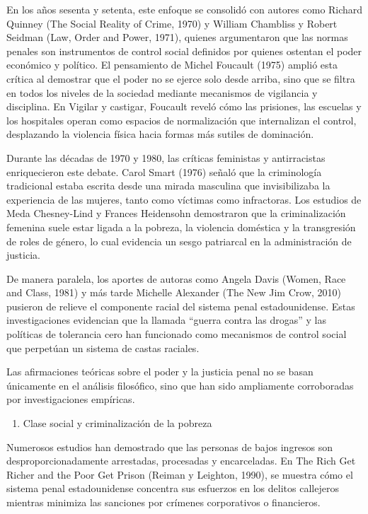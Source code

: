 \documentclass[
  spanish,
  letterpaper,
  DIV=11,
  numbers=noendperiod]{scrreprt}
\providecommand{\tightlist}{%
  \setlength{\itemsep}{0pt}\setlength{\parskip}{0pt}}
\begin{document}
En los años sesenta y setenta, este enfoque se consolidó con autores
como Richard Quinney (The Social Reality of Crime, 1970) y William
Chambliss y Robert Seidman (Law, Order and Power, 1971), quienes
argumentaron que las normas penales son instrumentos de control social
definidos por quienes ostentan el poder económico y político. El
pensamiento de Michel Foucault (1975) amplió esta crítica al demostrar
que el poder no se ejerce solo desde arriba, sino que se filtra en todos
los niveles de la sociedad mediante mecanismos de vigilancia y
disciplina. En Vigilar y castigar, Foucault reveló cómo las prisiones,
las escuelas y los hospitales operan como espacios de normalización que
internalizan el control, desplazando la violencia física hacia formas
más sutiles de dominación.

Durante las décadas de 1970 y 1980, las críticas feministas y
antirracistas enriquecieron este debate. Carol Smart (1976) señaló que
la criminología tradicional estaba escrita desde una mirada masculina
que invisibilizaba la experiencia de las mujeres, tanto como víctimas
como infractoras. Los estudios de Meda Chesney-Lind y Frances Heidensohn
demostraron que la criminalización femenina suele estar ligada a la
pobreza, la violencia doméstica y la transgresión de roles de género, lo
cual evidencia un sesgo patriarcal en la administración de justicia.

De manera paralela, los aportes de autoras como Angela Davis (Women,
Race and Class, 1981) y más tarde Michelle Alexander (The New Jim Crow,
2010) pusieron de relieve el componente racial del sistema penal
estadounidense. Estas investigaciones evidencian que la llamada ``guerra
contra las drogas'' y las políticas de tolerancia cero han funcionado
como mecanismos de control social que perpetúan un sistema de castas
raciales.

Las afirmaciones teóricas sobre el poder y la justicia penal no se basan
únicamente en el análisis filosófico, sino que han sido ampliamente
corroboradas por investigaciones empíricas.

\begin{enumerate}
\def\labelenumi{\alph{enumi})}
\tightlist
\item
  Clase social y criminalización de la pobreza
\end{enumerate}

Numerosos estudios han demostrado que las personas de bajos ingresos son
desproporcionadamente arrestadas, procesadas y encarceladas. En The Rich
Get Richer and the Poor Get Prison (Reiman y Leighton, 1990), se muestra
cómo el sistema penal estadounidense concentra sus esfuerzos en los
delitos callejeros mientras minimiza las sanciones por crímenes
corporativos o financieros.
\end{document}
